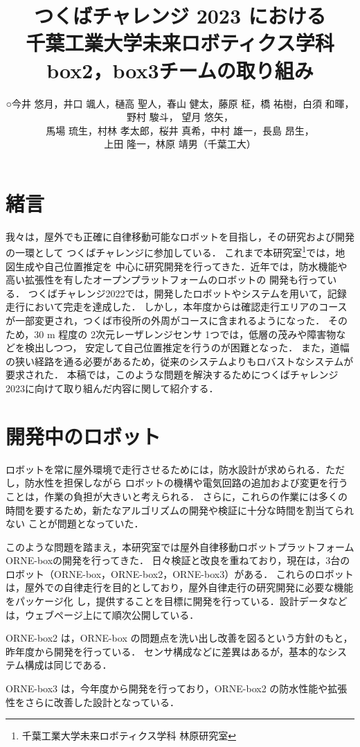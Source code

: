 \documentclass[twocolumn, 9pt]{jsproceedings}
\title{つくばチャレンジ 2023 における\\千葉工業大学未来ロボティクス学科 box2，box3チームの取り組み}
\author{○今井 悠月，井口 颯人，樋高 聖人，春山 健太，藤原 柾，\CID{8705}橋 祐樹，白須 和暉，野村 駿斗，
望月 悠矢，\\馬場 琉生，村林 孝太郎，桜井 真希，中村 雄一，長島 昂生，\\上田 隆一，林原 靖男（千葉工大）}
\affiliation{千葉工業大学未来ロボティクス学科 box2, box3チーム}
\begin{document}
\maketitle

\section{緒言}
我々は，屋外でも正確に自律移動可能なロボットを目指し，その研究および開発の一環として
つくばチャレンジに参加している．
これまで本研究室\footnote{千葉工業大学未来ロボティクス学科 林原研究室}では，地図生成や自己位置推定を
中心に研究開発を行ってきた．近年では，防水機能や高い拡張性を有したオープンプラットフォームのロボットの
開発も行っている．
つくばチャレンジ2022では，開発したロボットやシステムを用いて，記録走行において完走を達成した．
しかし，本年度からは確認走行エリアのコースが一部変更され，つくば市役所の外周がコースに含まれるようになった．
そのため，30 m 程度の 2次元レーザレンジセンサ 1つでは，低層の茂みや障害物などを検出しつつ，
安定して自己位置推定を行うのが困難となった．
また，道幅の狭い経路を通る必要があるため，従来のシステムよりもロバストなシステムが要求された．
本稿では，このような問題を解決するためにつくばチャレンジ2023に向けて取り組んだ内容に関して紹介する．

\section{開発中のロボット}
ロボットを常に屋外環境で走行させるためには，防水設計が求められる．ただし，防水性を担保しながら
ロボットの機構や電気回路の追加および変更を行うことは，作業の負担が大きいと考えられる．
さらに，これらの作業には多くの時間を要するため，新たなアルゴリズムの開発や検証に十分な時間を割当てられない
ことが問題となっていた．

このような問題を踏まえ，本研究室では屋外自律移動ロボットプラットフォーム ORNE-boxの開発を行ってきた\cite{box}．
日々検証と改良を重ねており，現在は，3台のロボット（ORNE-box，ORNE-box2，ORNE-box3）がある．
これらのロボットは，屋外での自律走行を目的としており，屋外自律走行の研究開発に必要な機能をパッケージ化
し，提供することを目標に開発を行っている．設計データなどは，ウェブページ上にて順次公開している\cite{box-data}．

ORNE-box2 は，ORNE-box の問題点を洗い出し改善を図るという方針のもと，昨年度から開発を行っている．
センサ構成などに差異はあるが，基本的なシステム構成は同じである．

ORNE-box3 は，今年度から開発を行っており，ORNE-box2 の防水性能や拡張性をさらに改善した設計となっている．
\end{document}
